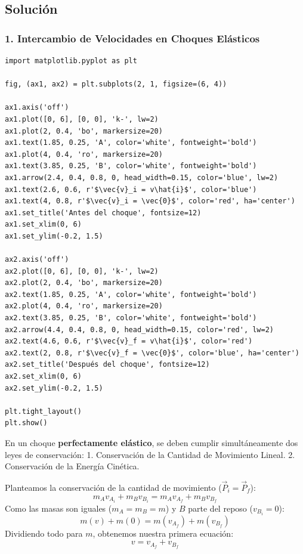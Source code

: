 \documentclass[12pt, a4paper]{article}
\begin{document}
\subsection*{Solución}

\subsubsection*{1. Intercambio de Velocidades en Choques Elásticos}

\begin{verbatim}
import matplotlib.pyplot as plt

fig, (ax1, ax2) = plt.subplots(2, 1, figsize=(6, 4))

ax1.axis('off')
ax1.plot([0, 6], [0, 0], 'k-', lw=2)
ax1.plot(2, 0.4, 'bo', markersize=20)
ax1.text(1.85, 0.25, 'A', color='white', fontweight='bold')
ax1.plot(4, 0.4, 'ro', markersize=20)
ax1.text(3.85, 0.25, 'B', color='white', fontweight='bold')
ax1.arrow(2.4, 0.4, 0.8, 0, head_width=0.15, color='blue', lw=2)
ax1.text(2.6, 0.6, r'$\vec{v}_i = v\hat{i}$', color='blue')
ax1.text(4, 0.8, r'$\vec{v}_i = \vec{0}$', color='red', ha='center')
ax1.set_title('Antes del choque', fontsize=12)
ax1.set_xlim(0, 6)
ax1.set_ylim(-0.2, 1.5)

ax2.axis('off')
ax2.plot([0, 6], [0, 0], 'k-', lw=2)
ax2.plot(2, 0.4, 'bo', markersize=20)
ax2.text(1.85, 0.25, 'A', color='white', fontweight='bold')
ax2.plot(4, 0.4, 'ro', markersize=20)
ax2.text(3.85, 0.25, 'B', color='white', fontweight='bold')
ax2.arrow(4.4, 0.4, 0.8, 0, head_width=0.15, color='red', lw=2)
ax2.text(4.6, 0.6, r'$\vec{v}_f = v\hat{i}$', color='red')
ax2.text(2, 0.8, r'$\vec{v}_f = \vec{0}$', color='blue', ha='center')
ax2.set_title('Después del choque', fontsize=12)
ax2.set_xlim(0, 6)
ax2.set_ylim(-0.2, 1.5)

plt.tight_layout()
plt.show()
\end{verbatim}

En un choque \textbf{perfectamente elástico}, se deben cumplir simultáneamente dos leyes de conservación:
1. Conservación de la Cantidad de Movimiento Lineal.
2. Conservación de la Energía Cinética.

Planteamos la conservación de la cantidad de movimiento ($\vec{P}_i = \vec{P}_f$):
$$ m_A v_{A_i} + m_B v_{B_i} = m_A v_{A_f} + m_B v_{B_f} $$
Como las masas son iguales ($m_A = m_B = m$) y $B$ parte del reposo ($v_{B_i} = 0$):
$$ m(v) + m(0) = m(v_{A_f}) + m(v_{B_f}) $$
Dividiendo todo para $m$, obtenemos nuestra primera ecuación:
$$ v = v_{A_f} + v_{B_f} $$
\end{document}
